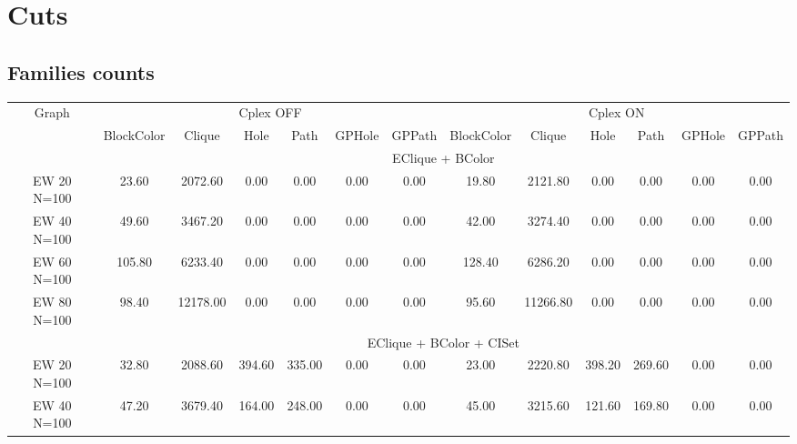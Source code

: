 \documentclass[landscape, 12pt]{report}
\begin{document}
\clearpage
	
	\section{Cuts}
	
	\subsection{Families counts}
	
	\begin{tabular}{|c|cccccc|cccccc|}
	\hline
	\multicolumn{1}{|c|}{Graph} & \multicolumn{6}{|c|}{Cplex OFF} & \multicolumn{6}{|c|}{Cplex ON} \\
	 & BlockColor & Clique & Hole & Path & GPHole & GPPath & BlockColor & Clique & Hole & Path & GPHole & GPPath \\
	\hline
	\multicolumn{1}{|c|}{} & \multicolumn{12}{|c|}{EClique + BColor} \\
	\hline
	EW 20 N=100 & 23.60 & 2072.60 & 0.00 & 0.00 & 0.00 & 0.00 & 19.80 & 2121.80 & 0.00 & 0.00 & 0.00 & 0.00
	\\
	EW 40 N=100 & 49.60 & 3467.20 & 0.00 & 0.00 & 0.00 & 0.00 & 42.00 & 3274.40 & 0.00 & 0.00 & 0.00 & 0.00
	\\
	EW 60 N=100 & 105.80 & 6233.40 & 0.00 & 0.00 & 0.00 & 0.00 & 128.40 & 6286.20 & 0.00 & 0.00 & 0.00 & 0.00
	\\
	EW 80 N=100 & 98.40 & 12178.00 & 0.00 & 0.00 & 0.00 & 0.00 & 95.60 & 11266.80 & 0.00 & 0.00 & 0.00 & 0.00
	\\
	\hline 
	\multicolumn{1}{|c|}{} & \multicolumn{12}{|c|}{EClique + BColor + CISet} \\
	\hline
	EW 20 N=100 & 32.80 & 2088.60 & 394.60 & 335.00 & 0.00 & 0.00 & 23.00 & 2220.80 & 398.20 & 269.60 & 0.00 & 0.00
	\\
	EW 40 N=100 & 47.20 & 3679.40 & 164.00 & 248.00 & 0.00 & 0.00 & 45.00 & 3215.60 & 121.60 & 169.80 & 0.00 & 0.00
	\\

\end{tabular}
\end{document}
